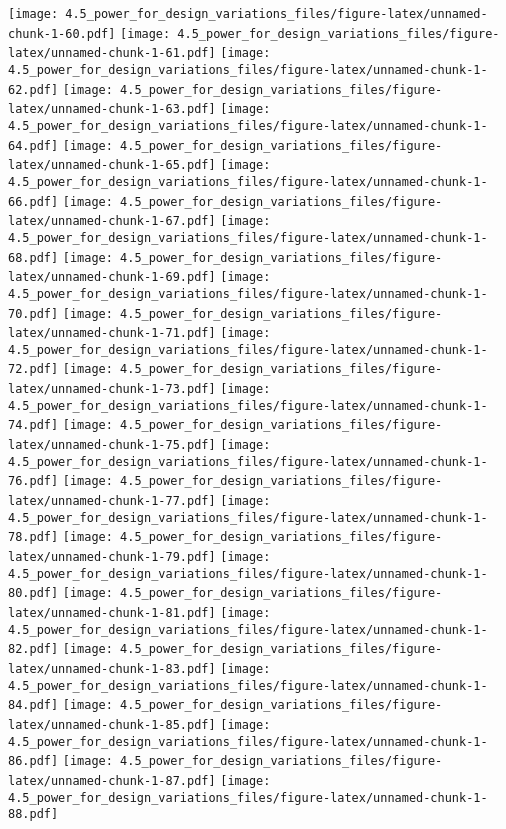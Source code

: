 \documentclass[]{article}
\begin{document}
\texttt{[image: 4.5\_power\_for\_design\_variations\_files/figure-latex/unnamed-chunk-1-60.pdf]}
\texttt{[image: 4.5\_power\_for\_design\_variations\_files/figure-latex/unnamed-chunk-1-61.pdf]}
\texttt{[image: 4.5\_power\_for\_design\_variations\_files/figure-latex/unnamed-chunk-1-62.pdf]}
\texttt{[image: 4.5\_power\_for\_design\_variations\_files/figure-latex/unnamed-chunk-1-63.pdf]}
\texttt{[image: 4.5\_power\_for\_design\_variations\_files/figure-latex/unnamed-chunk-1-64.pdf]}
\texttt{[image: 4.5\_power\_for\_design\_variations\_files/figure-latex/unnamed-chunk-1-65.pdf]}
\texttt{[image: 4.5\_power\_for\_design\_variations\_files/figure-latex/unnamed-chunk-1-66.pdf]}
\texttt{[image: 4.5\_power\_for\_design\_variations\_files/figure-latex/unnamed-chunk-1-67.pdf]}
\texttt{[image: 4.5\_power\_for\_design\_variations\_files/figure-latex/unnamed-chunk-1-68.pdf]}
\texttt{[image: 4.5\_power\_for\_design\_variations\_files/figure-latex/unnamed-chunk-1-69.pdf]}
\texttt{[image: 4.5\_power\_for\_design\_variations\_files/figure-latex/unnamed-chunk-1-70.pdf]}
\texttt{[image: 4.5\_power\_for\_design\_variations\_files/figure-latex/unnamed-chunk-1-71.pdf]}
\texttt{[image: 4.5\_power\_for\_design\_variations\_files/figure-latex/unnamed-chunk-1-72.pdf]}
\texttt{[image: 4.5\_power\_for\_design\_variations\_files/figure-latex/unnamed-chunk-1-73.pdf]}
\texttt{[image: 4.5\_power\_for\_design\_variations\_files/figure-latex/unnamed-chunk-1-74.pdf]}
\texttt{[image: 4.5\_power\_for\_design\_variations\_files/figure-latex/unnamed-chunk-1-75.pdf]}
\texttt{[image: 4.5\_power\_for\_design\_variations\_files/figure-latex/unnamed-chunk-1-76.pdf]}
\texttt{[image: 4.5\_power\_for\_design\_variations\_files/figure-latex/unnamed-chunk-1-77.pdf]}
\texttt{[image: 4.5\_power\_for\_design\_variations\_files/figure-latex/unnamed-chunk-1-78.pdf]}
\texttt{[image: 4.5\_power\_for\_design\_variations\_files/figure-latex/unnamed-chunk-1-79.pdf]}
\texttt{[image: 4.5\_power\_for\_design\_variations\_files/figure-latex/unnamed-chunk-1-80.pdf]}
\texttt{[image: 4.5\_power\_for\_design\_variations\_files/figure-latex/unnamed-chunk-1-81.pdf]}
\texttt{[image: 4.5\_power\_for\_design\_variations\_files/figure-latex/unnamed-chunk-1-82.pdf]}
\texttt{[image: 4.5\_power\_for\_design\_variations\_files/figure-latex/unnamed-chunk-1-83.pdf]}
\texttt{[image: 4.5\_power\_for\_design\_variations\_files/figure-latex/unnamed-chunk-1-84.pdf]}
\texttt{[image: 4.5\_power\_for\_design\_variations\_files/figure-latex/unnamed-chunk-1-85.pdf]}
\texttt{[image: 4.5\_power\_for\_design\_variations\_files/figure-latex/unnamed-chunk-1-86.pdf]}
\texttt{[image: 4.5\_power\_for\_design\_variations\_files/figure-latex/unnamed-chunk-1-87.pdf]}
\texttt{[image: 4.5\_power\_for\_design\_variations\_files/figure-latex/unnamed-chunk-1-88.pdf]}
\end{document}
